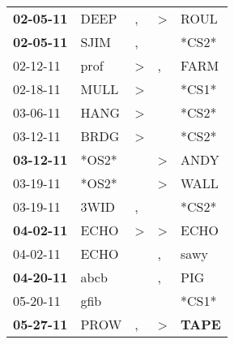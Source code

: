 \begin{supertabular}{p{0.07\textwidth}p{0.06\textwidth}p{0.02\textwidth}p{0.02\textwidth}p{0.06\textwidth}}
 \textbf{02-05-11\textsuperscript{}} &           DEEP\textsuperscript{} &                , &     \textgreater &           ROUL\textsuperscript{} \\
 \textbf{02-05-11\textsuperscript{}} &           SJIM\textsuperscript{} &                , &                  &                            *CS2* \\
          02-12-11\textsuperscript{} &           prof\textsuperscript{} &     \textgreater &                , &           FARM\textsuperscript{} \\
          02-18-11\textsuperscript{} &           MULL\textsuperscript{} &     \textgreater &                  &                            *CS1* \\
          03-06-11\textsuperscript{} &           HANG\textsuperscript{} &     \textgreater &                  &                            *CS2* \\
          03-12-11\textsuperscript{} &           BRDG\textsuperscript{} &     \textgreater &                  &                            *CS2* \\
 \textbf{03-12-11\textsuperscript{}} &                            *OS2* &                  &     \textgreater &           ANDY\textsuperscript{} \\
          03-19-11\textsuperscript{} &                            *OS2* &                  &     \textgreater &           WALL\textsuperscript{} \\
          03-19-11\textsuperscript{} &           3WID\textsuperscript{} &                , &                  &                            *CS2* \\
 \textbf{04-02-11\textsuperscript{}} &           ECHO\textsuperscript{} &     \textgreater &     \textgreater &           ECHO\textsuperscript{} \\
          04-02-11\textsuperscript{} &           ECHO\textsuperscript{} &                  &                , &           sawy\textsuperscript{} \\
 \textbf{04-20-11\textsuperscript{}} &           abcb\textsuperscript{} &                  &                , &            PIG\textsuperscript{} \\
          05-20-11\textsuperscript{} &           gfib\textsuperscript{} &                  &                  &                            *CS1* \\
 \textbf{05-27-11\textsuperscript{}} &           PROW\textsuperscript{} &                , &     \textgreater &  \textbf{TAPE\textsuperscript{}} \\

\end{supertabular}
